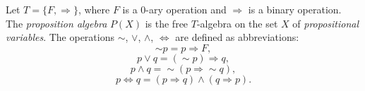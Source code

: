 Let $T = \{F, \Rightarrow\}$, where $F$ is a $0$-ary operation and $\Rightarrow$ is a binary operation. The \emph{proposition algebra} $P(X)$ is the free $T$-algebra on the set $X$ of \emph{propositional variables}. The operations $\sim$, $\vee$, $\wedge$, $\Leftrightarrow$ are defined as abbreviations:
$$\sim p = p \Rightarrow F,$$
$$p \vee q = (\sim p) \Rightarrow q,$$
$$p \wedge q = \sim(p \Rightarrow \sim q),$$
$$p \Leftrightarrow q = (p \Rightarrow q) \wedge (q \Rightarrow p).$$
